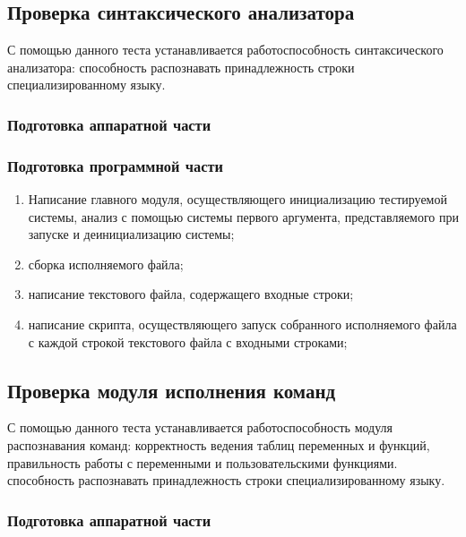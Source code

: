 \documentclass[a4paper, 12pt]{article}
\begin{document}

\subsection{Проверка синтаксического анализатора} %

С помощью данного теста устанавливается работоспособность синтаксического анализатора:
способность распознавать принадлежность строки специализированному языку.
\subsubsection{Подготовка аппаратной части} %
\subsubsection{Подготовка программной части} %
\begin{enumerate}
	\item Написание главного модуля, осуществляющего инициализацию
		тестируемой системы, анализ с помощью системы первого аргумента,
		представляемого при запуске и деинициализацию системы;
	\item сборка исполняемого файла;
	\item написание текстового файла, содержащего входные строки;
	\item написание скрипта, осуществляющего запуск собранного исполняемого файла
		с каждой строкой текстового файла с входными строками;
\end{enumerate}


\subsection{Проверка модуля исполнения команд} %

С помощью данного теста устанавливается работоспособность модуля распознавания команд:
корректность ведения таблиц переменных и функций, правильность работы с переменными и пользовательскими функциями.
способность распознавать принадлежность строки специализированному языку.
\subsubsection{Подготовка аппаратной части} %
\end{document}
